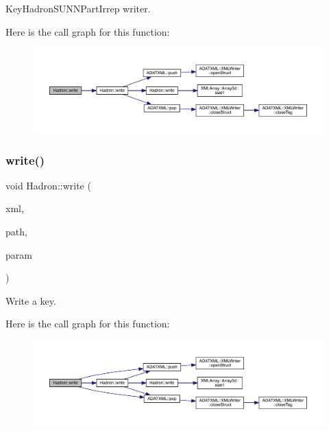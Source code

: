 Key\+Hadron\+S\+U\+N\+N\+Part\+Irrep writer. 

Here is the call graph for this function\+:
\nopagebreak
\begin{figure}[H]
\begin{center}
\leavevmode
\includegraphics[width=350pt]{d1/daf/namespaceHadron_a5a34021fb508d068cf35d125eef2e1b4_cgraph}
\end{center}
\end{figure}
\mbox{\label{namespaceHadron_a536d0c7d1bd20e64ba84b0588b3696f9}} 
\subsubsection{\texorpdfstring{write()}{write()}\hspace{0.1cm}{\footnotesize\ttfamily [33/95]}}
{\footnotesize\ttfamily void Hadron\+::write (\begin{DoxyParamCaption}\item[{\mbox{\hyperlink{classADATXML_1_1XMLWriter}{X\+M\+L\+Writer}} \&}]{xml,  }\item[{const std\+::string \&}]{path,  }\item[{const \mbox{\hyperlink{structHadron_1_1KeySingleHadronQuarkSpin__t}{Key\+Single\+Hadron\+Quark\+Spin\+\_\+t}} \&}]{param }\end{DoxyParamCaption})}



Write a key. 

Here is the call graph for this function\+:
\nopagebreak
\begin{figure}[H]
\begin{center}
\leavevmode
\includegraphics[width=350pt]{d1/daf/namespaceHadron_a536d0c7d1bd20e64ba84b0588b3696f9_cgraph}
\end{center}
\end{figure}
\mbox{\label{namespaceHadron_a38af8457b328042ae00ad011656edc71}} 
